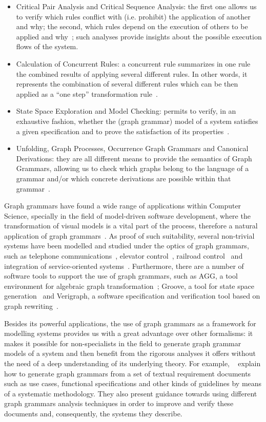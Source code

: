 \begin{itemize}
  \item Critical Pair Analysis and Critical Sequence Analysis: the first one allows us to verify which rules conflict with (i.e. prohibit) the application of another and why; the second, which rules depend on the execution of others to be applied and why~\cite{Lambers2008a}; such analyses provide insights about the possible execution flows of the system.
  \item Calculation of Concurrent Rules: a concurrent rule summarizes in one rule the combined results of applying several different rules. In other words, it represents the combination of several different rules which can be then applied as a ``one step'' transformation rule~\cite{Lambers2008,BezerraETMF2016}.
  \item State Space Exploration and Model Checking: permits to verify, in an exhaustive fashion, whether the (graph grammar) model of a system satisfies a given specification and to prove the satisfaction of its properties~\cite{Rensink2004}.
  \item Unfolding, Graph Processes, Occurrence Graph Grammars and Canonical Derivations: they are all different means to provide the semantics of Graph Grammars, allowing us to check which graphs belong to the language of a grammar and/or which concrete derivations are possible within that grammar~\cite{Corradini1996,Ribeiro1996}.
\end{itemize}

Graph grammars have found a wide range of applications within Computer Science, specially in the field of model-driven software development, where the transformation of visual models is a vital part of the process, therefore a natural application of graph grammars~\cite{Rozenberg1997}.
As proof of such suitability, several non-trivial systems have been modelled and studied under the optics of graph grammars, such as telephone communications~\cite{Ribeiro1996}, elevator control~\cite{Lambers2010}, railroad control~\cite{Pennemann2009} and integration of service-oriented systems~\cite{Giese2015}.
Furthermore, there are a number of software tools to support the use of graph grammars, such as AGG, a tool environment for algebraic graph transformation~\cite{Taentzer2000}; Groove, a tool for state space generation~\cite{Rensink2004} and Verigraph, a software specification and verification tool based on graph rewriting~\cite{verigraph}.

Besides its powerful applications, the use of graph grammars as a framework for modelling systems provides us with a great advantage over other formalisms: it makes it possible for non-specialists in the field to generate graph grammar models of a system and then benefit from the rigorous analyses it offers without the need of a deep understanding of its underlying theory. For example, ~\cite{Junior2015,BezerraWEIT2016,Cota2017} explain how to generate graph grammars from a set of textual requirement documents such as use cases, functional specifications and other kinds of guidelines by means of a systematic methodology. They also present guidance towards using different graph grammars analysis techniques in order to improve and verify these documents and, consequently, the systems they describe.

